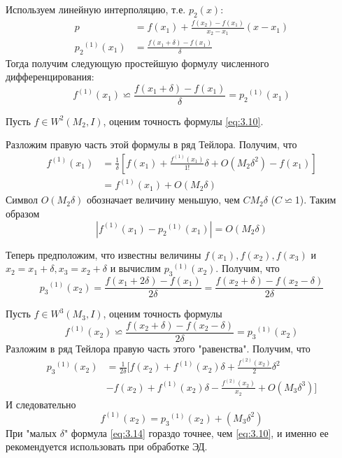 Используем линейную интерполяцию, т.е. $p_2(x)$:
\begin{equation}
	\begin{aligned}
	p &= f(x_1) + \frac{f(x_2) - f(x_1)}{x_2-x_1}(x-x_1) \\
	{p_2}^{(1)}(x_1) &= \frac{f(x_1+\delta) - f(x_1)}{\delta}
	\end{aligned}
\end{equation}
Тогда получим следующую простейшую формулу численного дифференцирования:
\begin{dmath} \label{eq:3.10}
	f^{(1)}(x_1) \backsimeq \frac{f(x_1 + \delta) - f(x_1)}{\delta} = {p_2}^{(1)}(x_1)
\end{dmath}

Пусть $f \in W^2(M_2, I)$, оценим точность формулы \ref{eq:3.10}.

Разложим правую часть этой формулы в ряд Тейлора. Получим, что
\begin{dmath} 
	\begin{aligned}
f^{(1)}(x_1) &= \frac{1}{\delta} [f(x_1) + \frac{f^{(1)}(x_1)}{1!}\delta + O(M_2\delta^2)-f(x_1)] \\
&= f^{(1)}(x_1) + O(M_2 \delta)
	\end{aligned}
\end{dmath}
Символ \textbf{$O(M_2\delta)$} обозначает величину меньшую, чем $CM_2\delta$ ($C\backsimeq$1). Таким образом
\begin{equation}
	|f^{(1)}(x_1) - {p_2}^{(1)}(x_1)| = O(M_2\delta)
\end{equation}

Теперь предположим, что известны величины $f(x_1), f(x_2), f(x_3)$ и $x_2=x_1+\delta, x_3 = x_2 + \delta$ и вычислим  ${p_3}^{(1)}(x_2)$. Получим, что  
\begin{equation}
	{p_3}^{(1)}(x_2) = \frac{f(x_1+2\delta) - f(x_1)}{2\delta} = \frac{f(x_2+\delta) - f(x_2 - \delta)}{2\delta}
\end{equation}

Пусть $f \in W^3(M_3, I)$, оценим точность формулы
\begin{equation} \label{eq:3.14}
	f^{(1)}(x_2) \backsimeq \frac{f(x_2+\delta) - f(x_2 - \delta)}{2\delta} = {p_3}^{(1)}(x_2)
\end{equation}
Разложим в ряд Тейлора правую часть этого "равенства". Получим, что
\begin{dmath} 
	\begin{aligned}
		{p_3}^{(1)}(x_2) &= \frac{1}{2\delta} [f(x_2) + {f^{(1)}(x_2)}\delta + \frac{f^{(2)}(x_2)}{2} \delta^2 \\ &- f(x_2) + f^{(1)}(x_2)\delta - \frac{f^{(2)}(x_2)}{x_2} + O(M_3\delta^3)]
	\end{aligned}
\end{dmath}
И следовательно
\begin{equation}
	f^{(1)}(x_2) =  {p_3}^{(1)}(x_2) + (M_3\delta^2)
\end{equation}
При "малых $\delta$" формула \ref{eq:3.14} гораздо точнее, чем \ref{eq:3.10}, и именно ее рекомендуется использовать при обработке ЭД.

